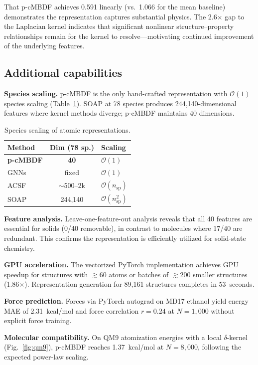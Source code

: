 \documentclass[twocolumn]{article}
\begin{document}
That p-cMBDF achieves 0.591 linearly (vs.\ 1.066 for the mean baseline) demonstrates the representation captures substantial physics.
The 2.6$\times$ gap to the Laplacian kernel indicates that significant nonlinear structure--property relationships remain for the kernel to resolve---motivating continued improvement of the underlying features.

\subsection{Additional capabilities}

\textbf{Species scaling.}
p-cMBDF is the only hand-crafted representation with $\mathcal{O}(1)$ species scaling (Table~\ref{tab:scaling}).
SOAP at 78 species produces 244,140-dimensional features where kernel methods diverge; p-cMBDF maintains 40 dimensions.

\begin{table}[h]
\centering
\small
\caption{Species scaling of atomic representations.}
\label{tab:scaling}
\begin{tabular}{lcl}
\toprule
Method & Dim (78 sp.) & Scaling \\
\midrule
\textbf{p-cMBDF} & \textbf{40} & $\mathcal{O}(1)$ \\
GNNs & fixed & $\mathcal{O}(1)$ \\
ACSF & $\sim$500--2k & $\mathcal{O}(n_\text{sp})$ \\
SOAP & 244,140 & $\mathcal{O}(n_\text{sp}^2)$ \\
\bottomrule
\end{tabular}
\end{table}

\textbf{Feature analysis.}
Leave-one-feature-out analysis reveals that all 40 features are essential for solids (0/40 removable), in contrast to molecules where 17/40 are redundant.
This confirms the representation is efficiently utilized for solid-state chemistry.

\textbf{GPU acceleration.}
The vectorized PyTorch implementation achieves GPU speedup for structures with $\gtrsim$60 atoms or batches of $\gtrsim$200 smaller structures (1.86$\times$).
Representation generation for 89,161 structures completes in 53~seconds.

\textbf{Force prediction.}
Forces via PyTorch autograd on MD17 ethanol yield energy MAE of 2.31~kcal/mol and force correlation $r = 0.24$ at $N = 1{,}000$ without explicit force training.

\textbf{Molecular compatibility.}
On QM9 atomization energies with a local $\delta$-kernel (Fig.~\ref{fig:qm9}), p-cMBDF reaches 1.37~kcal/mol at $N = 8{,}000$, following the expected power-law scaling.
\end{document}
